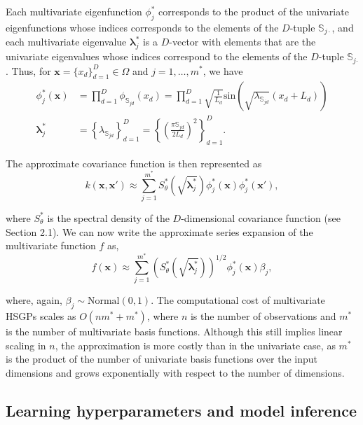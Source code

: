 \documentclass[]{interact}
\theoremstyle{plain}%
\theoremstyle{definition}
\theoremstyle{remark}
\begin{document}
Each multivariate eigenfunction $\phi^{\ast}_j$ corresponds to the product of the univariate eigenfunctions whose indices corresponds to the elements of the $D$-tuple $\mathbb{S}_{j\cdotp}$, and each multivariate eigenvalue $\bm{\lambda}^{\ast}_j$ is a $D$-vector with elements that are the univariate eigenvalues whose indices correspond to the elements of the $D$-tuple $\mathbb{S}_{j\bm{\cdotp}}$. Thus, for $\bm{x}=\{x_d\}_{d=1}^D \in \Omega$ and $j=1,\ldots,m^{\ast}$, we have 
%
\begin{align}
\phi^{\ast}_j(\bm{x}) &= \prod_{d=1}^{D} \phi_{\mathbb{S}_{jd}}(x_d) = \prod_{d=1}^{D} \sqrt{\frac{1}{L_d}} \text{sin}\left(\sqrt{\lambda_{\mathbb{S}_{jd}}}(x_d+L_d)\right) \label{eigenvalue_multi} \\
%
\bm{\lambda}^{\ast}_j &= \left\{ \lambda_{\mathbb{S}_{jd}} \right\}_{d=1}^D =  \left\{ \left(\tfrac{\pi \mathbb{S}_{jd}}{2L_d}\right)^2 \right\}_{d=1}^D. \label{eigenfunction_multi}
\end{align}

\noindent The approximate covariance function is then represented as
%
\begin{equation}\label{approxcov_multi}
k(\bm{x},\bm{x}') \approx \sum_{j=1}^{m^{\ast}} 
S^{\ast}_{\theta}\left(\sqrt{\bm{\lambda}^{\ast}_j}\right)
\phi^{\ast}_j(\bm{x}) \phi^{\ast}_j(\bm{x}'),
\end{equation}

\noindent where $S^{\ast}_{\theta}$ is the spectral density of the $D$-dimensional covariance function (see Section 2.1). We can now write the approximate series expansion of the multivariate function $f$ as,
%
\begin{equation}\label{approxf_multi}
f(\bm{x}) \approx \sum_{j=1}^{m^{\ast}} 
\left( S^{\ast}_{\theta} \left(\sqrt{\bm{\lambda}^{\ast}_j} \right)\right)^{1/2}
\phi^{\ast}_j(\bm{x}) \beta_j, 
\end{equation}

\noindent where, again, $\beta_j \sim \text{Normal}(0,1)$. The computational cost of multivariate HSGPs scales as $O(n m^{\ast} + m^{\ast})$, where $n$ is the number of observations and $m^{\ast}$ is the number of multivariate basis functions. Although this still implies linear scaling in $n$, the approximation is more costly than in the univariate case, as $m^{\ast}$ is the product of the number of univariate basis functions over the input dimensions and grows exponentially with respect to the number of  dimensions.

\subsection{Learning hyperparameters and model inference}
\end{document}
